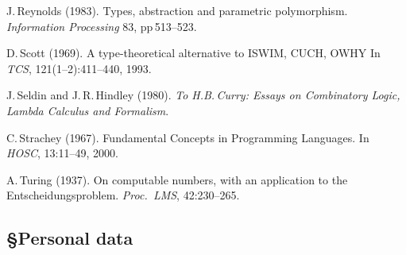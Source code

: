 \documentclass[11pt,twocolumn]{article}
\begin{document}
{\begin{thebibliography}{00}
J.\,Reynolds (1983).
\newblock Types, abstraction and parametric polymorphism.
\newblock \emph{Information Processing} 83, pp\,513--523.

D.\,Scott (1969).
\newblock A type-theoretical alternative to ISWIM, CUCH, OWHY
\newblock In \emph{TCS}, 121(1--2):411--440, 1993.

J.\,Seldin and J.\,R.\,Hindley (1980).
\newblock \emph{To H.B.\,Curry: Essays on Combinatory Logic, Lambda
  Calculus and Formalism}.

C.\,Strachey (1967).
\newblock Fundamental Concepts in Programming Languages.  
\newblock In \emph{HOSC}, 13:11--49, 2000.

A.\,Turing (1937). 
\newblock On computable numbers, with an application to the
  Entscheidungsproblem. 
\newblock \emph{Proc.\ LMS}, 42:230--265.

\end{thebibliography}}

\clearpage
\setcounter{page}{1}

\subsection*{\S\enspace\thinspace Personal data}
\end{document}
